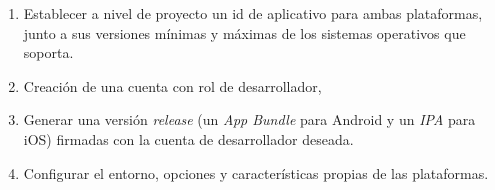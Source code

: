 \begin{enumerate}
    \item Establecer a nivel de proyecto un id de aplicativo para ambas plataformas, junto a sus
    versiones mínimas y máximas de los sistemas operativos que soporta.
    \item Creación de una cuenta con rol de desarrollador,
    \item Generar una versión \textit{release} (un \textit{App Bundle} para Android y 
    un \textit{IPA} para iOS) firmadas con la cuenta de desarrollador deseada.
    \item Configurar  el entorno, opciones y características propias de las plataformas.
\end{enumerate}